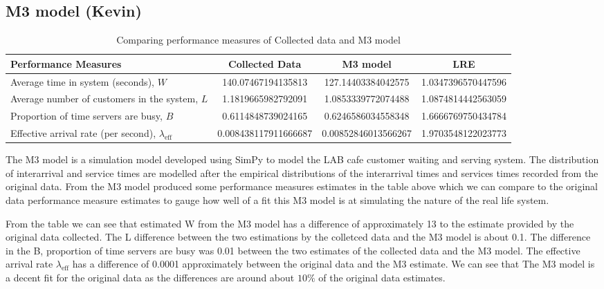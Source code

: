 \documentclass{article}
\begin{document}
\subsection{M3 model (Kevin)}

\begin{table}[H]
    \centering
    \caption{Comparing performance measures of Collected data and M3 model}
    \begin{tabu}{X S S S}
        \toprule
        \textbf{Performance Measures} & \textbf{Collected Data} & \textbf{M3 model}& \textbf{LRE}\\
        \midrule
        Average time in system (seconds), $W$ & 140.07467194135813 & 127.14403384042575 & 1.0347396570447596\\
        Average number of customers in the system, $L$ & 1.1819665982792091 & 1.0853339772074488 & 1.0874814442563059\\
        Proportion of time servers are busy, $B$ & 0.6114848739024165 & 0.6246586034558348 & 1.6666769750434784\\
        Effective arrival rate (per second), $\lambda_{\text{eff}}$ & 0.008438117911666687 & 0.00852846013566267 & 1.9703548122023773\\
        \bottomrule
    \end{tabu}
    \label{tab:M3}
\end{table}

The M3 model is a simulation model developed using SimPy to model the LAB cafe customer waiting and serving system. The distribution of interarrival and service times are modelled after the empirical distributions of the interarrival times and services times recorded from the original data. From the M3 model produced some performance measures estimates in the table above which we can compare to the original data performance measure estimates to gauge how well of a fit this M3 model is at simulating the nature of the real life system.

From the table we can see that estimated W from the M3 model has a difference of approximately 13 to the estimate provided by the original data collected. The L difference between the two estimations by the colletced data and the M3 model is about 0.1. The difference in the B, proportion of time servers are busy was 0.01 between the two estimates of the collected data and the M3 model. The effective arrival rate $\lambda_{\text{eff}}$ has a difference of 0.0001 approximately between the original data and the M3 estimate. We can see that The M3 model is a decent fit for the original data as the differences are around about $10\%$ of the original data estimates.
\end{document}
